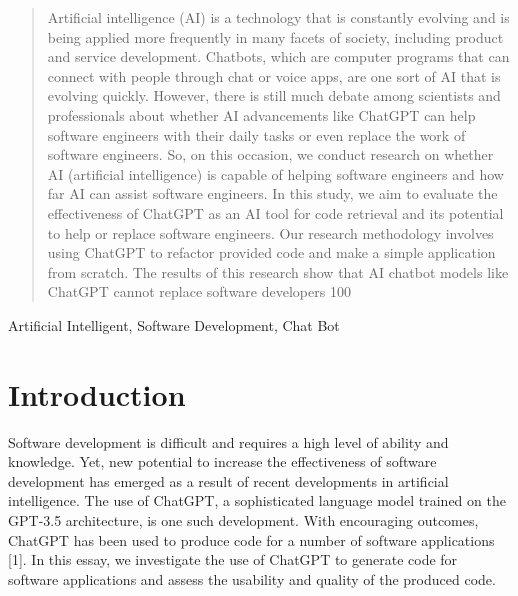 \documentclass[conference]{IEEEtran}
\begin{document}
\maketitle

\begin{abstract}
Artificial intelligence (AI) is a technology that is constantly evolving and is being applied more frequently in many facets of society, including product and service development. Chatbots, which are computer programs that can connect with people through chat or voice apps, are one sort of AI that is evolving quickly. However, there is still much debate among scientists and professionals about whether AI advancements like ChatGPT can help software engineers with their daily tasks or even replace the work of software engineers. So, on this occasion, we conduct research on whether AI (artificial intelligence) is capable of helping software engineers and how far AI can assist software engineers. In this study, we aim to evaluate the effectiveness of ChatGPT as an AI tool for code retrieval and its potential to help or replace software engineers. Our research methodology involves using ChatGPT to refactor provided code and make a simple application from scratch. The results of this research show that AI chatbot models like ChatGPT cannot replace software developers 100%
\end{abstract}

\begin{IEEEkeywords}
Artificial Intelligent, Software Development, Chat Bot
\end{IEEEkeywords}

\section{Introduction}
Software development is difficult and requires a high level of ability and knowledge. Yet, new potential to increase the effectiveness of software development has emerged as a result of recent developments in artificial intelligence. The use of ChatGPT, a sophisticated language model trained on the GPT-3.5 architecture, is one such development. With encouraging outcomes, ChatGPT has been used to produce code for a number of software applications [1]. In this essay, we investigate the use of ChatGPT to generate code for software applications and assess the usability and quality of the produced code.
\end{document}
